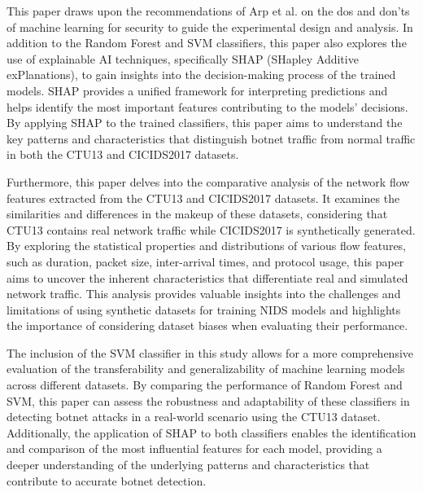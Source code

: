 This paper draws upon the recommendations of Arp et al.\cite{arp2022and} on the dos and don'ts of machine learning for security to guide the experimental design and analysis. In addition to the Random Forest and SVM classifiers, this paper also explores the use of explainable AI techniques, specifically SHAP (SHapley Additive exPlanations)\cite{lundberg2017unified}, to gain insights into the decision-making process of the trained models. SHAP provides a unified framework for interpreting predictions and helps identify the most important features contributing to the models' decisions. By applying SHAP to the trained classifiers, this paper aims to understand the key patterns and characteristics that distinguish botnet traffic from normal traffic in both the CTU13 and CICIDS2017 datasets.

Furthermore, this paper delves into the comparative analysis of the network flow features extracted from the CTU13 and CICIDS2017 datasets. It examines the similarities and differences in the makeup of these datasets, considering that CTU13 contains real network traffic while CICIDS2017 is synthetically generated. By exploring the statistical properties and distributions of various flow features, such as duration, packet size, inter-arrival times, and protocol usage, this paper aims to uncover the inherent characteristics that differentiate real and simulated network traffic. This analysis provides valuable insights into the challenges and limitations of using synthetic datasets for training NIDS models and highlights the importance of considering dataset biases when evaluating their performance.

The inclusion of the SVM classifier in this study allows for a more comprehensive evaluation of the transferability and generalizability of machine learning models across different datasets. By comparing the performance of Random Forest and SVM, this paper can assess the robustness and adaptability of these classifiers in detecting botnet attacks in a real-world scenario using the CTU13 dataset. Additionally, the application of SHAP to both classifiers enables the identification and comparison of the most influential features for each model, providing a deeper understanding of the underlying patterns and characteristics that contribute to accurate botnet detection.

